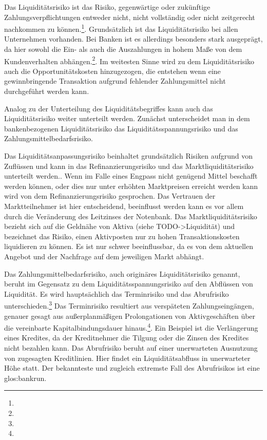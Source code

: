 Das Liquiditätsrisiko ist das Risiko, gegenwärtige oder zukünftige Zahlungsverpflichtungen entweder nicht, nicht vollständig oder nicht zeitgerecht nachkommen zu können.\footnote{  }. Grundsätzlich ist das Liquiditätsrisiko bei allen Unternehmen vorhanden. Bei Banken ist es allerdings besonders stark ausgeprägt, da hier sowohl die Ein- als auch die Auszahlungen in hohem Maße von dem Kundenverhalten abhängen.\footnote{ }. Im weitesten Sinne wird zu dem Liquiditätsrisiko auch die Opportunitätskosten hinzugezogen, die entstehen wenn eine gewinnbringende Transaktion aufgrund fehlender Zahlungsmittel nicht durchgeführt werden kann.

Analog zu der Unterteilung des Liquiditätsbegriffes kann auch das Liquiditätsrisiko weiter unterteilt werden. Zunächst unterscheidet man in dem bankenbezogenen Liquiditätsrisiko das Liquiditätsspannungsrisiko und das Zahlungsmittelbedarfsrisiko.

Das Liquiditätsanpassungsrisiko beinhaltet grundsätzlich Risiken aufgrund von Zuflüssen und kann in das Refinanzierungsrisiko und das Marktliquiditätsrisiko unterteilt werden.. Wenn im Falle eines Engpass nicht genügend Mittel beschafft werden können, oder dies nur unter erhöhten Marktpreisen erreicht werden kann wird von dem Refinanzierungsrisiko gesprochen. Das Vertrauen der Marktteilnehmer ist hier entscheidend, beeinflusst werden kann es vor allem durch die Veränderung des Leitzinses der Notenbank. Das Marktliquiditätsrisiko bezieht sich auf die Geldnähe von Aktiva (siehe TODO->Liquidität) und bezeichnet das Risiko, einen Aktivposten nur zu hohen Transaktionskosten liquidieren zu können. Es ist nur schwer beeinflussbar, da es von dem aktuellen Angebot und der Nachfrage auf dem jeweiligen Markt abhängt. 

Das Zahlungsmittelbedarfsrisiko, auch originäres Liquiditätsrisiko genannt, beruht im Gegensatz zu dem Liquiditätsspannungsrisiko auf den Abflüssen von Liquidität. Es wird hauptsächlich das Terminrisiko und das Abrufrisiko unterschieden.\footnote{ } Das Terminrisiko resultiert aus verspäteten Zahlungseingängen, genauer gesagt aus außerplanmäßigen Prolongationen von Aktivgeschäften über die vereinbarte Kapitalbindungsdauer hinaus.\footnote{ }. Ein Beispiel ist die Verlängerung eines Kredites, da der Kreditnehmer die Tilgung oder die Zinsen des Kredites nicht bezahlen kann. Das Abrufrisiko beruht auf einer unerwarteten Ausnutzung von zugesagten Kreditlinien. Hier findet ein Liquiditätsabfluss in unerwarteter Höhe statt. Der bekannteste und zugleich extremste Fall des Abrufrisikos ist eine \gls{glos:bankrun}.

